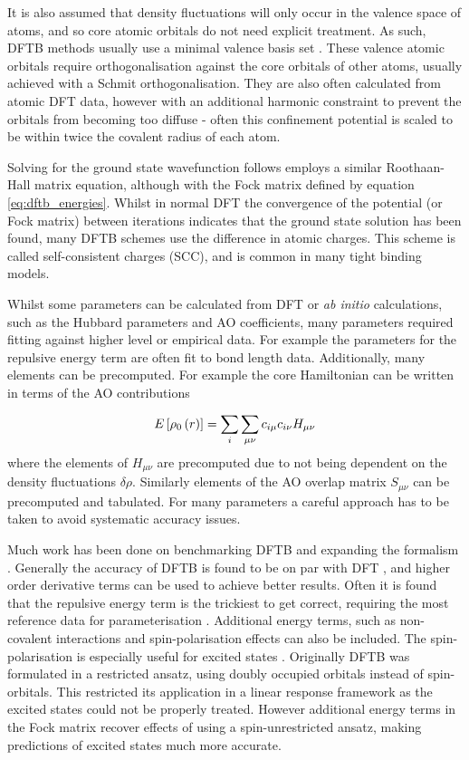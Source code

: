 It is also assumed that density fluctuations will only occur in the valence space
of atoms, and so core atomic orbitals do not need explicit treatment. As such, DFTB
methods usually use a minimal valence basis set \cite{Bannwarth2020}. These valence
atomic orbitals require orthogonalisation against the core orbitals of other atoms,
usually achieved with a Schmit orthogonalisation. They are also often calculated
from atomic DFT data, however with an additional harmonic constraint to prevent
the orbitals from becoming too diffuse - often this confinement potential is scaled 
to be within twice the covalent radius of each atom.

Solving for the ground state wavefunction follows employs a similar Roothaan-Hall 
matrix equation, although with the Fock matrix defined by equation \ref{eq:dftb_energies}.
Whilst in normal DFT the convergence of the potential (or Fock matrix) between iterations
indicates that the ground state solution has been found, many DFTB schemes use the
difference in atomic charges. This scheme is called self-consistent charges (SCC),
and is common in many tight binding models.

Whilst some parameters can be calculated from DFT or \emph{ab initio} calculations,
such as the Hubbard parameters and AO coefficients, many parameters required fitting
against higher level or empirical data. For example the parameters for the repulsive
energy term are often fit to bond length data. Additionally, many elements can be
precomputed. For example the core Hamiltonian can be written in terms of the AO
contributions 

\begin{equation}
    E_{} \left[ \rho_0\left(r\right) \right] = \sum_i \sum_{\mu\nu} c_{i\mu}c_{i\nu} H_{\mu\nu}
\end{equation}
%
where the elements of $H_{\mu\nu}$ are precomputed due to not being dependent on
the density fluctuations $\delta \rho$. Similarly elements of the AO overlap matrix
$S_{\mu\nu}$ can be precomputed and tabulated. For many parameters a careful approach
has to be taken to avoid systematic accuracy issues.

Much work has been done on benchmarking DFTB and expanding the formalism \cite{Koskinen2009, Goldman2012, AndreaRozzi2004, Kohler2005, Niehaus2005, Han2000}. 
Generally the accuracy of DFTB is found to be on par with DFT \cite{Lutsker2015, Gruden2017, Vuong2018},
and higher order derivative terms can be used to achieve better results. Often it
is found that the repulsive energy term is the trickiest to get correct, requiring 
the most reference data for parameterisation \cite{Koskinen2009}. Additional energy 
terms, such as non-covalent interactions and spin-polarisation effects can also 
be included. The spin-polarisation is especially useful for excited states \cite{Melix2016}. 
Originally DFTB was formulated in a restricted ansatz, using doubly occupied orbitals 
instead of spin-orbitals. This restricted its application in a linear response framework 
as the excited states could not be properly treated. However additional energy terms 
in the Fock matrix recover effects of using a spin-unrestricted ansatz, making predictions
of excited states much more accurate.

